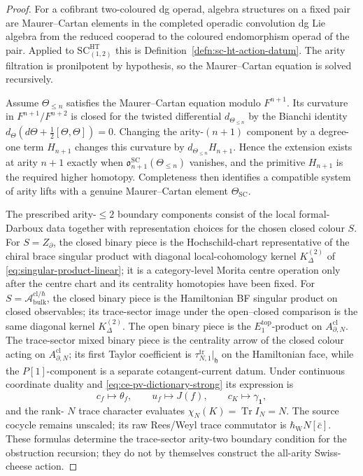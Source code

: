 \begin{proof}
For a cofibrant two-coloured dg operad, algebra structures on a fixed
pair are Maurer--Cartan elements in the completed operadic convolution
dg Lie algebra from the reduced cooperad to the coloured endomorphism
operad of the pair.  Applied to
\(\mathrm{SC}^{\mathrm{HT}}_{(1,2)}\) this is
Definition~\ref{defn:sc-ht-action-datum}.  The arity filtration is
pronilpotent by hypothesis, so the Maurer--Cartan equation is solved
recursively.

Assume \(\Theta_{\le n}\) satisfies the Maurer--Cartan equation modulo
\(F^{n+1}\).  Its curvature in
\(F^{n+1}/F^{n+2}\) is closed for the twisted differential
\(d_{\Theta_{\le n}}\) by the Bianchi identity
\(d_\Theta(d\Theta+\frac12[\Theta,\Theta])=0\).  Changing the
arity-\((n+1)\) component by a degree-one term \(H_{n+1}\) changes this
curvature by \(d_{\Theta_{\le n}}H_{n+1}\).  Hence the extension exists
at arity \(n+1\) exactly when
\(\mathfrak o^{\mathrm{SC}}_{n+1}(\Theta_{\le n})\) vanishes, and the
primitive \(H_{n+1}\) is the required higher homotopy.  Completeness
then identifies a compatible system of arity lifts with a genuine
Maurer--Cartan element \(\Theta_{\mathrm{SC}}\).

The prescribed arity-\(\le2\) boundary components consist of the local
formal-Darboux data together with representation choices for the chosen
closed colour \(S\).  For \(S=Z_\partial\), the closed binary piece is
the Hochschild-chart representative of the chiral brace singular product
with diagonal local-cohomology kernel \(K^{(2)}_\Delta\) of
\eqref{eq:singular-product-linear}; it is a category-level Morita centre
operation only after the centre chart and its centrality homotopies have
been fixed.  For \(S=\mathcal A^{\mathrm{cl}/\hbar}_{\mathrm{bulk}}\),
the closed binary piece is the Hamiltonian BF singular product on closed
observables; its trace-sector image under the open--closed comparison is
the same diagonal kernel \(K^{(2)}_\Delta\).  The open binary piece is the
\(E_1^{\mathrm{top}}\)-product on
  \(A^{\mathrm{cl}}_{\partial,N}\).  The trace-sector mixed binary piece
  is the centrality arrow of the closed colour acting on
  \(A^{\mathrm{cl}}_{\partial,N}\); its first Taylor coefficient is
  \(\tau_{N,1}^{\mathrm{tr}}|_{\mathfrak h}\) on the Hamiltonian face,
  while the \(P[1]\)-component is a separate cotangent-current datum.
  Under continuous coordinate duality and
\eqref{eq:ce-pv-dictionary-strong} its expression is
\[
  c_f\mapsto\theta_f,\qquad
  u_f\mapsto J(f),\qquad
  c_K\mapsto\gamma_{\mathbf 1},
\]
and the rank-
\(N\) trace character evaluates
\(\chi_N(K)=\operatorname{Tr}I_N=N\).  The source cocycle remains
unscaled; its raw Rees/Weyl trace commutator is
\(\hbar_{\mathrm W}N[\bar c]\).  These formulas determine the
trace-sector arity-two boundary condition for the obstruction recursion;
they do not by themselves construct the all-arity Swiss-cheese action.


\end{proof}
